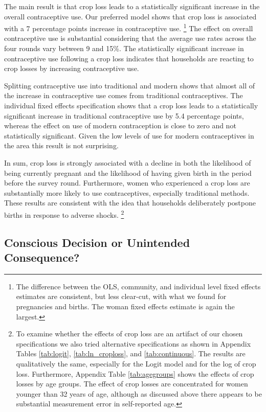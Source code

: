 \documentclass[letterpaper,12pt]{article}
\begin{document}
The main result is that crop loss leads to a statistically significant 
increase in the overall contraceptive use.
Our preferred model shows that crop loss is associated with
a 7 percentage points increase in contraceptive use.%
\footnote{
The difference between the OLS, community, and individual level fixed effects
estimates are consistent, but less clear-cut, with what we found for pregnancies 
and births.
The woman fixed effects estimate is again the largest.
}
The effect on overall contraceptive use is substantial considering that the 
average use rates across the four rounds vary between 9 and 15\%.
The statistically significant increase in contraceptive use following
a crop loss indicates that households are reacting to crop 
losses by increasing contraceptive use.

Splitting contraceptive use into traditional and modern shows that almost
all of the increase in contraceptive use comes from traditional contraceptives.
The individual fixed effects specification shows that a
crop loss leads to a statistically significant increase in
traditional contraceptive use by 5.4 percentage points, whereas
the effect on use of modern contraception is close to zero
and not statistically significant. 
Given the low levels of use for modern contraceptives in the area
this result is not surprising.

In sum, crop loss is strongly associated with a decline in
both the likelihood of being currently pregnant and the likelihood
of having given birth in the period before the survey round.
Furthermore, women who experienced a crop loss are substantially
more likely to use contraceptives, especially traditional methods.
These results are consistent with the idea that households 
deliberately postpone births in response to adverse shocks.%
\footnote{
To examine whether the effects of crop loss are an artifact of our
chosen specifications we also tried alternative specifications
as shown in Appendix Tables \ref{tab:logit}, \ref{tab:ln_croploss}, 
and \ref{tab:continuous}.
The results are qualitatively the same, especially for the Logit model
and for the log of crop loss.
Furthermore, Appendix Table \ref{tab:agegroups} shows the effects
of crop losses by age groups.
The effect of crop losses are concentrated for women younger than 32
years of age, although as discussed above there appears to be 
substantial measurement error in self-reported age.
}

\subsection{Conscious Decision or Unintended Consequence?}
\end{document}
